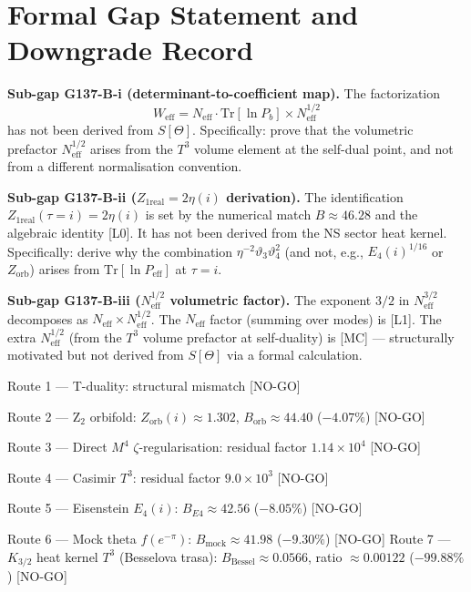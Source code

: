 \documentclass[12pt,a4paper]{article}
\begin{document}
\section{Formal Gap Statement and Downgrade Record}
\label{sec:formal-gap}

\begin{gapbox}[title={Gap G137-B --- Minimal Missing Theorem}]
\textbf{Sub-gap G137-B-i (determinant-to-coefficient map).}
The factorization
\[
W_{\mathrm{eff}} = N_{\mathrm{eff}} \cdot \mathrm{Tr}[\ln P_b] \times
N_{\mathrm{eff}}^{1/2}
\]
has not been derived from $S[\Theta]$. Specifically: prove that the volumetric
prefactor $N_{\mathrm{eff}}^{1/2}$ arises from the $T^3$ volume element at the
self-dual point, and not from a different normalisation convention.

\medskip
\textbf{Sub-gap G137-B-ii ($Z_{1\mathrm{real}} = 2\eta(i)$ derivation).}
The identification $Z_{1\mathrm{real}}(\tau=i) = 2\eta(i)$ is set by the
numerical match $B \approx 46.28$ and the algebraic identity [L0]. It has not
been derived from the NS sector heat kernel. Specifically: derive why the
combination $\eta^{-2}\vartheta_3\vartheta_4^2$ (and not, e.g.,
$E_4(i)^{1/16}$ or $Z_{\mathrm{orb}}$) arises from
$\mathrm{Tr}[\ln P_{\mathrm{eff}}]$ at $\tau = i$.

\medskip
\textbf{Sub-gap G137-B-iii ($N_{\mathrm{eff}}^{1/2}$ volumetric factor).}
The exponent $3/2$ in $N_{\mathrm{eff}}^{3/2}$ decomposes as
$N_{\mathrm{eff}} \times N_{\mathrm{eff}}^{1/2}$. The $N_{\mathrm{eff}}$
factor (summing over modes) is [L1]. The extra $N_{\mathrm{eff}}^{1/2}$
(from the $T^3$ volume prefactor at self-duality) is [MC] --- structurally
motivated but not derived from $S[\Theta]$ via a formal calculation.
\end{gapbox}

\begin{deadendbox}[title={No-Go Record}]
Route 1 --- T-duality: structural mismatch [NO-GO]

Route 2 --- Z$_2$ orbifold: $Z_{\mathrm{orb}}(i) \approx 1.302$,
$B_{\mathrm{orb}} \approx 44.40$ ($-4.07\%$) [NO-GO]

Route 3 --- Direct $M^4$ $\zeta$-regularisation: residual factor $1.14\times10^4$ [NO-GO]

Route 4 --- Casimir $T^3$: residual factor $9.0\times10^3$ [NO-GO]

Route 5 --- Eisenstein $E_4(i)$: $B_{E4} \approx 42.56$ ($-8.05\%$) [NO-GO]

Route 6 --- Mock theta $f(e^{-\pi})$: $B_{\mathrm{mock}} \approx 41.98$ ($-9.30\%$) [NO-GO]
Route 7 --- $K_{3/2}$ heat kernel $T^3$ (Besselova trasa): $B_{\mathrm{Bessel}} \approx 0.0566$, ratio $\approx 0.00122$ ($-99.88\%$) [NO-GO]
\end{deadendbox}
\end{document}
